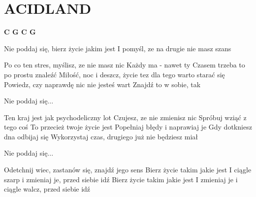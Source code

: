 \documentclass[../../../songbook.tex]{subfiles}
\begin{document}
\TabPositions{9cm} %
\section*{ACIDLAND}
{}
\vspace{0.5cm}
{\color{red}\textbf{C G C G} } \newline
            
\-\hspace{1cm} Nie poddaj się, bierz życie jakim jest		 \newline
\-\hspace{1cm} I pomyśl, ze na drugie nie masz szans		 \newline

Po co ten stres, myślisz, ze nie masz nic			 \newline
Każdy ma - nawet ty									 \newline
Czasem trzeba to po prostu znaleźć					 \newline
Miłość, noc i deszcz, życie tez dla tego warto starać się	 \newline
Powiedz, czy naprawdę nic nie jesteś wart			 \newline
Znajdź to w sobie, tak						 \newline

\-\hspace{1cm} Nie poddaj się... \newline

Ten kraj jest jak psychodeliczny lot \newline
Czujesz, ze nie zmienisz nic \newline
Spróbuj wziąć z tego coś \newline
To przecież twoje życie jest \newline
Popełniaj błędy i naprawiaj je \newline
Gdy dotkniesz dna odbijaj się \newline
Wykorzystaj czas, drugiego już nie będziesz miał \newline

\-\hspace{1cm} Nie poddaj się... \newline

Odetchnij wiec, zastanów się, znajdź jego sens	 \newline
Bierz życie takim jakie jest \newline
I ciągle szarp i zmieniaj je, przed siebie idź \newline
Bierz życie takim jakie jest \newline
I zmieniaj je i ciągle walcz, przed siebie idź  \newline
\end{document}
